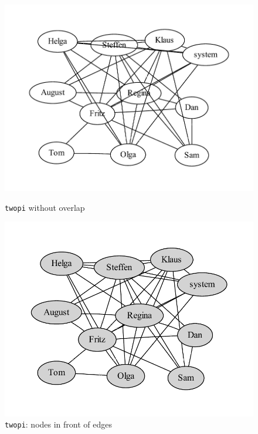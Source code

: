 \documentclass[a4paper]{scrartcl}
\newcommand{\code}[1]{\texttt{\color{code}#1}}
\begin{document}
\begin{figure}
\parbox[b]{0.5\textwidth}{\centering
  \includegraphics[width=\linewidth]{gv_ca-twopi-ol}\vspace{-1cm}
  \caption{\code{twopi} without overlap}
  \label{fig:gv-catwopi2}}%
\parbox[b]{0.5\textwidth}{\centering
  \includegraphics[width=\linewidth]{gv_ca-twopi-olf}\vspace{-1cm}
  \caption{\code{twopi}: nodes in front of edges}
  \label{fig:gv-catwopi3}}
\end{figure}
\end{document}
